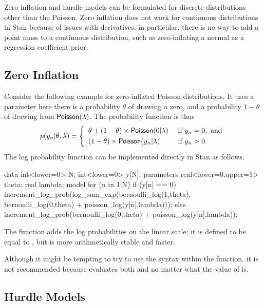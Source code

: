 Zero inflation and hurdle models can be formulated for discrete
distributions other than the Poisson.  Zero inflation does not work
for continuous distributions in Stan because of issues with
derivatives; in particular, there is no way to add a point mass to a
continuous distribution, such as zero-inflating a normal as a
regression coefficient prior.


\subsection{Zero Inflation}

Consider the following example for zero-inflated Poisson
distributions.  It uses a parameter  here there is a
probability $\theta$ of drawing a zero, and a probability $1 - \theta$
of drawing from $\distro{Poisson}(\lambda)$.  The probability function
is thus
\[
p(y_n|\theta,\lambda) 
= 
\left\{
\begin{array}{ll}
\theta + (1 - \theta) \times \distro{Poisson}(0|\lambda) & \mbox{ if } y_n = 0, \mbox{ and}
\\[3pt]
(1-\theta) \times \distro{Poisson}(y_n|\lambda) & \mbox{ if } y_n > 0.
\end{array}
\right.
\] 
%
The log probability function can be implemented directly in Stan as follows.
%
\begin{stancode}
data {
  int<lower=0> N;
  int<lower=0> y[N];
}
parameters {
  real<lower=0,upper=1> theta;
  real lambda;
}
model {
  for (n in 1:N) {
    if (y[n] == 0)
      increment_log_prob(log_sum_exp(bernoulli_log(1,theta),
                                     bernoulli_log(0,theta) 
                                     + poisson_log(y[n],lambda)));
    else
      increment_log_prob(bernoulli_log(0,theta)
                         + poisson_log(y[n],lambda));
  }
}
\end{stancode}
%
The  function adds the log probabilities
on the linear scale; it is defined to be equal to , but is more arithmetically stable and faster.

Although it might be tempting to try to use the  syntax
within the  function, it is not recommended
because  evaluates both  and
 no matter what the value of  is.

\subsection{Hurdle Models}

